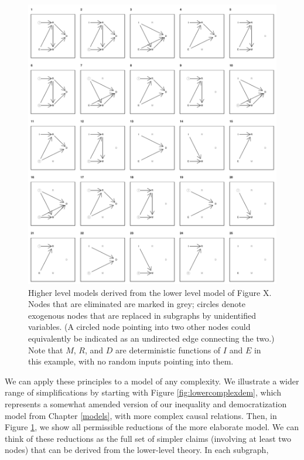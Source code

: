 \documentclass[12pt,]{book}
\begin{document}
\begin{figure}
\centering
\includegraphics{ii_files/figure-latex/runningsubs-1.pdf}
\caption{\label{fig:runningsubs}Higher level models derived from the lower level model of Figure X. Nodes that are eliminated are marked in grey; circles denote exogenous nodes that are replaced in subgraphs by unidentified variables. (A circled node pointing into two other nodes could equivalently be indicated as an undirected edge connecting the two.) Note that \(M\), \(R\), and \(D\) are deterministic functions of \(I\) and \(E\) in this example, with no random inputs pointing into them.}
\end{figure}

We can apply these principles to a model of any complexity. We illustrate a wider range of simplifications by starting with Figure \ref{fig:lowercomplexdem}, which represents a somewhat amended version of our inequality and democratization model from Chapter \ref{models}, with more complex causal relations. Then, in Figure \ref{fig:runningsubs}, we show all permissible reductions of the more elaborate model. We can think of these reductions as the full set of simpler claims (involving at least two nodes) that can be derived from the lower-level theory. In each subgraph,
\end{document}
